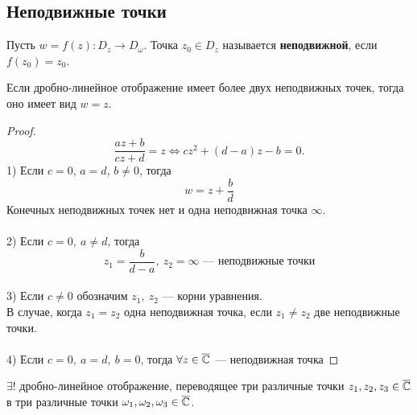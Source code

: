 	\subsection{Неподвижные точки}
	\begin{definition}
		Пусть $w = f(z) : D_z \to D_\omega$. Точка $z_0 \in D_z$ называется \textbf{неподвижной}, если $f(z_0) = z_0$.
	\end{definition}
	\begin{theorem}
		Если дробно-линейное отображение имеет более двух неподвижных точек, тогда оно имеет вид $w = z$.
	\end{theorem}
	\begin{proof}
		\[\frac{az+b}{cz+d} = z \iff cz^2 + (d - a)z - b = 0. \]
		1) Если $c = 0$, $a = d$, $b \neq 0$, тогда \[w = z + \frac{b}{d}\]
		\noindent
		Конечных неподвижных точек нет и одна неподвижная точка $\infty$.\\
		\\2) Если $c = 0, \ a \neq d$, тогда
		\[z_1 = \frac{b}{d-a},\ z_2 = \infty \text{ --- неподвижные точки}\]
		\\3) Если $c \neq 0 \text{ обозначим } z_1,\ z_2$ --- корни уравнения.\\
		В случае, когда $ z_1 = z_2 $ одна неподвижная точка, если $ z_1 \neq z_2 $ две неподвижные точки.\\
		\\4) Если $c = 0,\ a = d,\ b = 0$, тогда $ \forall z \in \overline{\mathbb{C}} $ --- неподвижная точка
	\end{proof}
	\begin{theorem}
		$\exists !$ дробно-линейное отображение, переводящее три различные точки $z_1, z_2, z_3 \in \overline{\mathbb{C}}$\\ в три различные точки $\omega_1, \omega_2, \omega_3 \in \overline{\mathbb{C}}$.
	\end{theorem}
